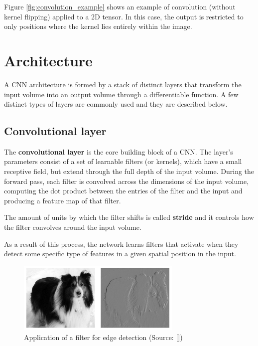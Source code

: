 Figure \ref{fig:convolution_example} shows an example of convolution (without kernel flipping) applied to a 2D tensor. In this case, the output is restricted to only positions where the kernel lies entirely within the image.

\section{Architecture}

A \acs{CNN} architecture is formed by a stack of distinct layers that transform the input volume into an output volume through a differentiable function. A few distinct types of layers are commonly used and they are described below.

\subsection{Convolutional layer}

The \textbf{convolutional layer} is the core building block of a \acs{CNN}. The layer's parameters consist of a set of learnable filters (or kernels), which have a small receptive field, but extend through the full depth of the input volume. During the forward pass, each filter is convolved across the dimensions of the input volume, computing the dot product between the entries of the filter and the input and producing a feature map of that filter.

The amount of units by which the filter shifts is called \textbf{stride} and it controls how the filter convolves around the input volume.

As a result of this process, the network learns filters that activate when they detect some specific type of features in a given spatial position in the input.

\begin{figure}
	\centering
	\includegraphics[width=0.7\textwidth]{Images/filter_application}
	\caption{Application of a filter for edge detection (Source: [\cite{Goodfellow-et-al-2016}])}\label{fig:filter_application}
\end{figure}

